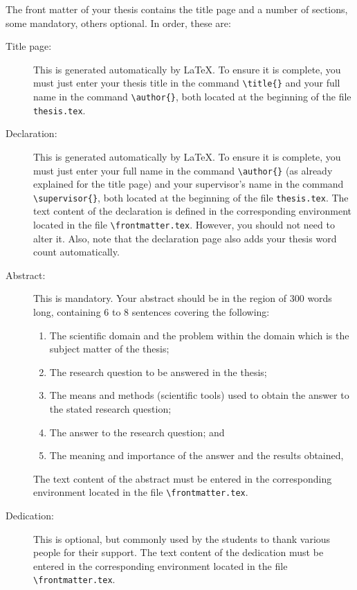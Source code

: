 \documentclass[11pt,twoside,openright]{report}
\newcommand{\supervisor}{[Prof/Dr] Supervisor Name}
\begin{document}
The front matter of your thesis contains the title page and a number of sections, some mandatory, others optional. 
In order, these are:
\begin{description}
    \item [Title page:] This is generated automatically by \LaTeX{}. To ensure it is complete, you must just enter your thesis title in the command \verb|\title{}| and your full name in the command \verb|\author{}|, both located at the beginning of the file \verb|thesis.tex|.
    
    \item [Declaration:] This is generated automatically by \LaTeX{}. To ensure it is complete, you must just enter your full name in the command \verb|\author{}| (as already explained for the title page) and your supervisor's name in the command \verb|\supervisor{}|, both located at the beginning of the file \verb|thesis.tex|. The text content of the declaration is defined in the corresponding environment located in the file \verb|\frontmatter.tex|. However, you should not need to alter it. Also, note that the declaration page also adds your thesis word count automatically.
    
    \item [Abstract:] This is mandatory. Your abstract should be in the region of 300 words long, containing 6 to 8 sentences covering the following:
    \begin{enumerate}[noitemsep]
        \item The scientific domain and the problem within the domain which is the subject matter of the thesis;
        \item The research question to be answered in the thesis;
        \item The means and methods (scientific tools) used to obtain the answer to the stated research question;
        \item The answer to the research question; and
        \item The meaning and importance of the answer and the results obtained,
    \end{enumerate}
    The text content of the abstract must be entered in the corresponding environment located in the file \verb|\frontmatter.tex|.
    
    \item [Dedication:] This is optional, but commonly used by the students to thank various people for their support.  The text content of the dedication must be entered in the corresponding environment located in the file \verb|\frontmatter.tex|.
    

\end{description}
\end{document}

